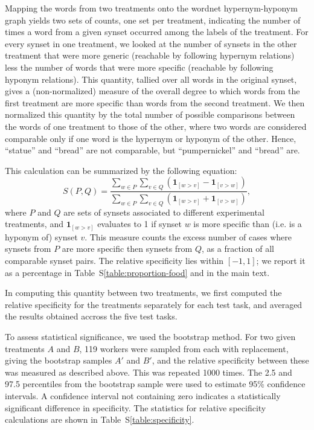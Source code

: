 \documentclass{sigchi}
\begin{document}
Mapping the words from two treatments onto the wordnet 
hypernym-hyponym graph yields two sets of counts, one set per treatment, 
indicating the number of times a word from a given synset occurred among the
labels of the treatment.  For every synset in one treatment, we looked
at the number of synsets in the other treatment that were more generic
(reachable by following hypernym relations) less the number of words that
were more specific (reachable by following hyponym relations).  This quantity,
tallied over all words in the original synset, gives a (non-normalized) 
measure of the overall degree to which words from the first treatment are more
specific than words from the second treatment.  We then normalized this 
quantity by the total number of possible comparisons between the words of
one treatment to those of the other, where two words are considered comparable
only if one word is the hypernym or hyponym of the other.  Hence, ``statue'' 
and ``bread'' are not comparable, but ``pumpernickel'' and ``bread'' are.

This calculation can be summarized by the following equation:
\begin{equation}
	S(P,Q) = \frac{
		\sum_{w\in P}\sum_{v\in Q} \left(
			\mathbf{1}_{[w>v]} - \mathbf{1}_{[v>w]} \right)
	}{
		\sum_{w\in P}\sum_{v\in Q} \left(
			\mathbf{1}_{[w>v]} + \mathbf{1}_{[v>w]} \right)
	},
\end{equation}
where $P$ and $Q$ are sets of synsets associated to different experimental 
treatments, and $\mathbf{1}_{[w>v]}$ evaluates
to 1 if synset $w$ is more specific than (i.e. is a hyponym of) synset $v$.
This measure counts the excess number of cases where synsets from $P$ are more
specific then synsets from $Q$, as a fraction of all comparable synset pairs. 
The relative specificity lies within $[-1,1]$; we report it as a percentage 
in Table~S\ref{table:proportion-food} and in the main text.

In computing this quantity between two treatments, we first computed the 
relative specificity for the treatments separately for each test task, and 
averaged the results obtained accross the five test tasks.

To assess statistical significance, we used the bootstrap method.
For two given treatments $A$ and $B$, 
119 workers were sampled from each with replacement, giving the bootstrap
samples $A'$ and $B'$, and the relative specificity between these 
was measured as described above.
This was repeated 1000 times.  The 2.5 and 97.5 percentiles from the 
bootstrap sample were used to estimate 95\% confidence intervals.  
A confidence interval not containing zero indicates a statistically 
significant difference in specificity.  
The statistics for relative specificity 
calculations are shown in Table~S\ref{table:specificity}.
\end{document}
